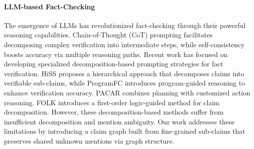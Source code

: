 \paragraph{LLM-based Fact-Checking}
The emergence of LLMs has revolutionized fact-checking through their powerful reasoning capabilities. 
Chain-of-Thought (CoT) prompting \cite{wei2022chain} facilitates decomposing complex verification into intermediate steps, while self-consistency \cite{wang2022self} boosts accuracy via multiple reasoning paths.  
Recent work has focused on developing specialized decomposition-based prompting strategies for fact verification. HiSS \cite{zhang2023towards} proposes a hierarchical approach that decomposes claims into verifiable sub-claims, while ProgramFC \cite{pan2023fact} introduces program-guided reasoning to enhance verification accuracy. PACAR \cite{zhao2024pacar} combines planning with customized action reasoning. FOLK \cite{wang2023explainable} introduces a first-order logic-guided method for claim decomposition. 
However, these decomposition-based methods suffer from insufficient decomposition and mention ambiguity. Our work addresses these limitations by introducing a claim graph built from fine-grained sub-claims that preserves shared unknown mentions via graph structure.

